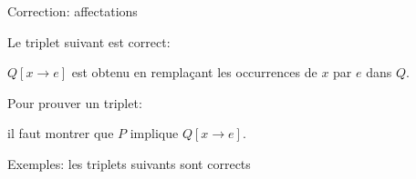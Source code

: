 \begin{frame}{Correction: affectations}

Le triplet suivant est correct:
\begin{center}\footnotesize
{}
\end{center}
$Q[x\rightarrow e]$ est obtenu en remplaçant les occurrences de $x$ par $e$ dans $Q$.
\bigskip

Pour prouver un triplet:
\begin{center}\footnotesize
{}
\end{center}
il faut montrer que $P$ implique $Q[x\rightarrow e]$.

\bigskip

Exemples: les triplets suivants sont corrects
\begin{columns}
\begin{column}{5cm}
\begin{center}\footnotesize
{}
\end{center}
\end{column}
\begin{column}{5cm}
\begin{center}\footnotesize
{}
\end{center}
\end{column}
\end{columns}


\end{frame}

